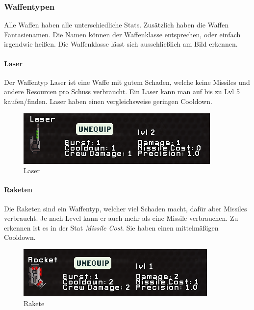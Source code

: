 \documentclass[fontsize=12pt,paper=a4,twoside]{scrartcl}
\begin{document}
\subsubsection{Waffentypen}

Alle Waffen haben alle unterschiedliche Stats. Zusätzlich haben die Waffen Fantasienamen. Die Namen können der Waffenklasse entsprechen, oder einfach irgendwie heißen. Die Waffenklasse lässt sich ausschließlich am Bild erkennen. 

\paragraph{Laser}

Der Waffentyp Laser ist eine Waffe mit gutem Schaden, welche keine Missiles und andere Resourcen pro Schuss verbraucht. Ein Laser kann man auf bis zu Lvl 5 kaufen/finden. Laser haben einen vergleichsweise geringen Cooldown. 


\begin{figure}[H]
\centering
\includegraphics[width=1\linewidth]{DasSpiel/Kampf/waffen/laser.png}
\caption{Laser}
\end{figure}


\paragraph{Raketen}

Die Raketen sind ein Waffentyp, welcher viel Schaden macht, dafür aber Missiles verbraucht. Je nach Level kann er auch mehr als eine Missile verbrauchen. Zu erkennen ist es in der Stat \textit{Missile Cost}. Sie haben einen mittelmäßigen Cooldown.

\begin{figure}[H]
\centering
\includegraphics[width=1\linewidth]{DasSpiel/Kampf/waffen/rakete.png}
\caption{Rakete}
\end{figure}
\end{document}
